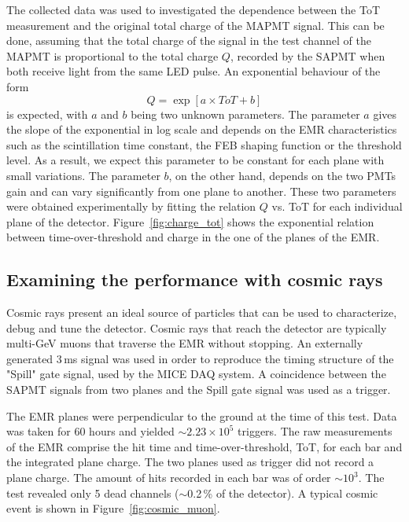\documentclass[a4paper,11pt]{article}
\begin{document}
The collected data was used to investigated the dependence between the ToT measurement and the original total charge of the MAPMT signal. This can be done,
assuming that the total charge of the signal in the test channel of the MAPMT is proportional to the total charge $Q$, recorded by the SAPMT when both receive
light from the same LED pulse. An exponential behaviour of the form
\begin{equation}
 Q=\exp\left[a\times ToT+b\right]
 \label{exp}
\end{equation}
is expected, with $a$ and $b$ being two unknown parameters. The parameter $a$ gives the slope of the exponential in log scale and depends on the EMR 
characteristics such as the scintillation time constant, the FEB shaping function or the threshold level. As a result, we expect this parameter to be
constant for each plane with small variations. The parameter $b$, on the other hand, depends on the two PMTs gain and can vary significantly from one
plane to another. These two parameters were obtained experimentally by fitting the relation $Q$ vs. ToT for each individual plane of the detector. Figure~\ref{fig:charge_tot} shows the exponential relation between time-over-threshold and charge in the one of the planes of the EMR.

\subsection{Examining the performance with cosmic rays}\label{sec:cosmic_perf}
Cosmic rays present an ideal source of particles that can be used to characterize, debug and tune the detector. Cosmic rays that reach the detector are
typically multi-GeV muons that traverse the EMR without stopping. An externally generated 3\,ms signal was used in order to reproduce the timing structure
of the "Spill" gate signal, used by the MICE DAQ system. A coincidence between the SAPMT signals from two planes and the Spill gate signal was used
as a trigger.

The EMR planes were perpendicular to the ground at the time of this test. Data was taken for 60 hours and yielded $\sim2.23\times10^5$ triggers. The raw
measurements of the EMR comprise the hit time and time-over-threshold, ToT, for each bar and the integrated plane charge. The two planes used as trigger did not record a plane
charge. The amount of hits recorded in each bar was of order $\sim10^3$.  The test revealed only 5 dead channels ($\sim$0.2\,\% of the detector). A typical
cosmic event is shown in Figure~\ref{fig:cosmic_muon}. 
\end{document}
